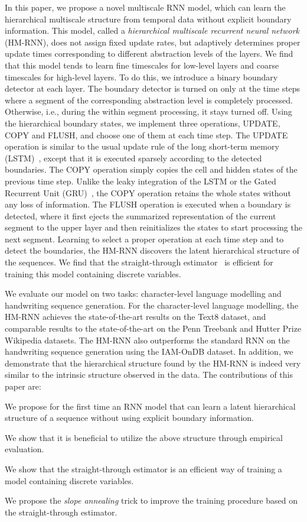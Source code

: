 \documentclass{article} %
\begin{document}
In this paper, we propose a novel multiscale RNN model, which can learn the hierarchical multiscale structure from temporal data without explicit boundary information. 
This model, called a \textit{hierarchical multiscale recurrent neural network} (HM-RNN), 
does not assign fixed update rates, but adaptively determines proper update times corresponding to different abstraction levels of the layers. 
We find that this model tends to learn fine timescales for low-level layers and coarse timescales for high-level layers. 
To do this, we introduce a binary boundary detector at each layer. 
The boundary detector is turned on only at the time steps where a segment of the corresponding abstraction level is completely processed. 
Otherwise, i.e., during the within segment processing, it stays turned off. 
Using the hierarchical boundary states, we implement three operations, UPDATE, COPY and FLUSH, and choose one of them at each time step. 
The UPDATE operation is similar to the usual update rule of the long short-term memory (LSTM)~\citep{hochreiter1997long},
except that it is executed sparsely according to the detected boundaries. 
The COPY operation simply copies the cell and hidden states of the previous time step. 
Unlike the leaky integration of the LSTM or the Gated Recurrent Unit (GRU)~\citep{Cho-et-al-EMNLP2014}, 
the COPY operation retains the whole states without any loss of information. 
The FLUSH operation is executed when a boundary is detected, where it first ejects the summarized representation of the current segment to the upper layer
and then reinitializes the states to start processing the next segment. 
Learning to select a proper operation at each time step and to detect the boundaries, the HM-RNN discovers the latent hierarchical structure of the sequences. 
We find that the straight-through estimator~\citep{hinton2012coursera,bengio2013estimating,courbariaux2016binarized} is efficient 
for training this model containing discrete variables.

We evaluate our model on two tasks: character-level language modelling and handwriting sequence generation. 
For the character-level language modelling, the HM-RNN achieves the state-of-the-art results 
on the Text8 dataset, and comparable results to the state-of-the-art on the Penn Treebank and Hutter Prize Wikipedia datasets.
The HM-RNN also outperforms the standard RNN on the handwriting sequence generation using the IAM-OnDB dataset.
In addition, we demonstrate that the hierarchical structure found by 
the HM-RNN is indeed very similar to the intrinsic structure observed in the data. 
The contributions of this paper are:
\bitem
    \item We propose for the first time an RNN model that can learn a latent hierarchical structure of a sequence without using explicit boundary information.
    \item We show that it is beneficial to utilize the above structure through empirical evaluation. 
	\item We show that the straight-through estimator is an efficient way of training a model containing discrete variables. 
    \item We propose the {\it slope annealing} trick to improve the training procedure based on the straight-through estimator.
\eitem
\end{document}
